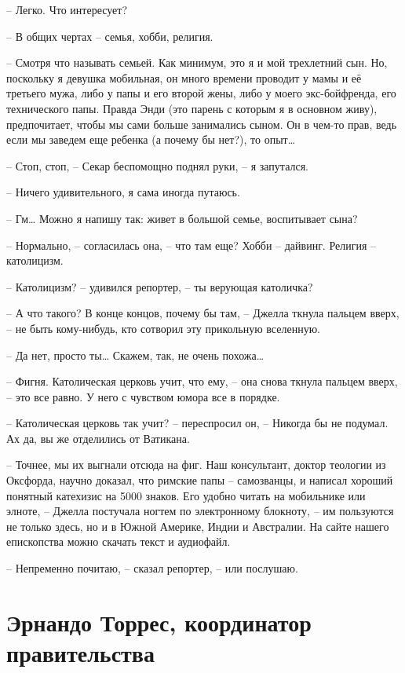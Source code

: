 -- Легко. Что интересует?

-- В общих чертах -- семья, хобби, религия.

-- Смотря что называть семьей. Как минимум, это я и мой трехлетний сын. Но, поскольку я девушка мобильная, он много времени проводит у мамы и её третьего мужа, либо у папы и его второй жены, либо у моего экс-бойфренда, его технического папы. Правда Энди (это парень с которым я в основном живу), предпочитает, чтобы мы сами больше занимались сыном. Он в чем-то прав, ведь если мы заведем еще ребенка (а почему бы нет?), то опыт\ldots{}

-- Стоп, стоп, -- Секар беспомощно поднял руки, -- я запутался.

-- Ничего удивительного, я сама иногда путаюсь.

-- Гм\ldots{} Можно я напишу так: живет в большой семье, воспитывает сына?

-- Нормально, -- согласилась она, -- что там еще? Хобби -- дайвинг. Религия -- католицизм.

-- Католицизм? -- удивился репортер, -- ты верующая католичка?

-- А что такого? В конце концов, почему бы там, -- Джелла ткнула пальцем вверх, -- не быть кому-нибудь, кто сотворил эту прикольную вселенную.

-- Да нет, просто ты\ldots{} Скажем, так, не очень похожа\ldots{}

-- Фигня. Католическая церковь учит, что ему, -- она снова ткнула пальцем вверх, -- это все равно. У него с чувством юмора все в порядке.

-- Католическая церковь так учит? -- переспросил он, -- Никогда бы не подумал. Ах да, вы же отделились от Ватикана.

-- Точнее, мы их выгнали отсюда на фиг. Наш консультант, доктор теологии из Оксфорда, научно доказал, что римские папы -- самозванцы, и написал хороший понятный катехизис на 5000 знаков. Его удобно читать на мобильнике или элноте, -- Джелла постучала ногтем по электронному блокноту, -- им пользуются не только здесь, но и в Южной Америке, Индии и Австралии. На сайте нашего епископства можно скачать текст и аудиофайл.

-- Непременно почитаю, -- сказал репортер, -- или послушаю.


\chapter{Эрнандо Торрес, координатор правительства}


